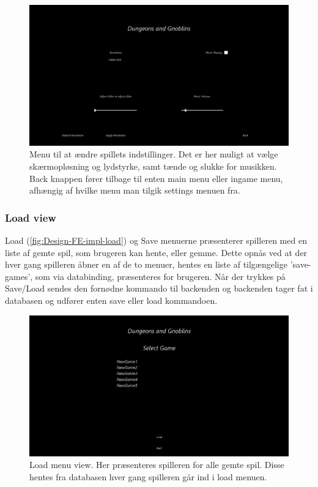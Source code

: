 \begin{figure}[H]
\centering
\includegraphics[width = \textwidth]{02-Body/Images/SettingsMenu_final.PNG}
\caption{Menu til at ændre spillets indstillinger. Det er her muligt at vælge skærmopløsning og lydstyrke, samt tænde og slukke for musikken. Back knappen fører tilbage til enten main menu eller ingame menu, afhængig af hvilke menu man tilgik settings menuen fra.}
\label{fig:Design-FE-impl-settings}
\end{figure}

\subsubsection{Load view}

Load (\autoref{fig:Design-FE-impl-load}) og Save menuerne præsenterer spilleren med en liste af gemte spil, som brugeren kan hente, eller gemme. Dette opnås ved at der hver gang spilleren åbner en af de to menuer, hentes en liste af tilgængelige 'save-games', som via databinding, præsenteres for brugeren. Når der trykkes på Save/Load sendes den fornødne kommando til backenden og backenden tager fat i databasen og udfører enten save eller load kommandoen.

\begin{figure}[H]
\centering
\includegraphics[width = \textwidth]{02-Body/Images/LoadMenu_final.png}
\caption{Load menu view. Her præsenteres spilleren for alle gemte spil. Disse hentes fra databasen hver gang spilleren går ind i load menuen.}
\label{fig:Design-FE-impl-load}
\end{figure}

